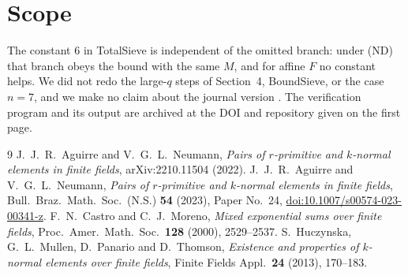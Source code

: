 \documentclass[11pt,a4paper]{amsart}
\theoremstyle{remark}
\begin{document}
\section{Scope}

The constant $6$ in TotalSieve is independent of the omitted branch: under (ND) that branch obeys the bound with the
same $M$, and for affine $F$ no constant helps. We did not
redo the large-$q$ steps of Section~4, BoundSieve, or the case $n=7$, and we make no claim about the journal version
\cite{ANjournal}. The verification program and its output are archived at the DOI and repository given on the first page.

\begin{thebibliography}{9}
 J.~J.~R.~Aguirre and V.~G.~L.~Neumann, \emph{Pairs of $r$-primitive and $k$-normal elements in finite
fields}, arXiv:2210.11504 (2022).
 J.~J.~R.~Aguirre and V.~G.~L.~Neumann, \emph{Pairs of $r$-primitive and $k$-normal elements in
finite fields}, Bull.\ Braz.\ Math.\ Soc.\ (N.S.) \textbf{54} (2023), Paper No.~24,
\href{https://doi.org/10.1007/s00574-023-00341-z}{doi:10.1007/s00574-023-00341-z}.
 F.~N.~Castro and C.~J.~Moreno, \emph{Mixed exponential sums over finite fields}, Proc.\ Amer.\ Math.\
Soc.\ \textbf{128} (2000), 2529--2537.
 S.~Huczynska, G.~L.~Mullen, D.~Panario and D.~Thomson, \emph{Existence and properties of
$k$-normal elements over finite fields}, Finite Fields Appl.\ \textbf{24} (2013), 170--183.
\end{thebibliography}
\end{document}
